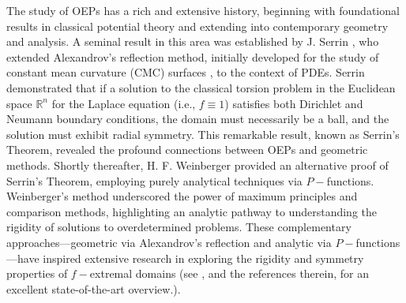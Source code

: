 \documentclass[11pt]{article}
\numberwithin{equation} {section}
\begin{document}
The study of OEPs has a rich and extensive history, beginning with foundational results in classical potential theory and extending into contemporary geometry and analysis. A seminal result in this area was established by J. Serrin \cite{Se}, who extended Alexandrov's reflection method, initially developed for the study of constant mean curvature (CMC) surfaces \cite{Ale}, to the context of PDEs. Serrin demonstrated that if a solution to the classical torsion problem in the Euclidean space $\mathbb{R}^n$ for the Laplace equation (i.e., \(f \equiv 1\)) satisfies both Dirichlet and Neumann boundary conditions, the domain must necessarily be a ball, and the solution must exhibit radial symmetry. This remarkable result, known as Serrin's Theorem, revealed the profound connections between OEPs and geometric methods. Shortly thereafter, H. F. Weinberger \cite{We} provided an alternative proof of Serrin's Theorem, employing purely analytical techniques via $P-$functions. Weinberger’s method underscored the power of maximum principles and comparison methods, highlighting an analytic pathway to understanding the rigidity of solutions to overdetermined problems. These complementary approaches—geometric via Alexandrov’s reflection and analytic via $P-$functions—have inspired extensive research in exploring the rigidity and symmetry properties of $f-$extremal domains (see \cite{CWZ}, and the references therein, for an excellent state-of-the-art overview.).
\end{document}
